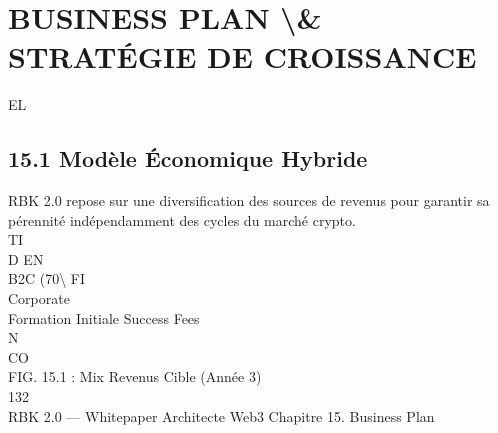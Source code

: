 \section{BUSINESS PLAN \textbackslash{}& STRATÉGIE DE CROISSANCE}
\vspace{0.5em}
\vspace{0.5em}
\vspace{0.5em}
\vspace{0.5em}
EL\\
\subsection{15.1 Modèle Économique Hybride}
RBK 2.0 repose sur une diversification des sources de revenus pour garantir sa pérennité indépendamment des cycles du marché crypto.\\
\vspace{0.5em}
\vspace{0.5em}
\vspace{0.5em}
\vspace{0.5em}
TI\\
D     EN\\
B2C (70\textbackslash{}%
\vspace{0.5em}
\vspace{0.5em}
\vspace{0.5em}
\vspace{0.5em}
FI\\
Corporate\\
Formation Initiale   Success Fees\\
\vspace{0.5em}
N\\
CO\\
FIG. 15.1 : Mix Revenus Cible (Année 3)\\
\vspace{0.5em}
\vspace{0.5em}
\vspace{0.5em}
\vspace{0.5em}
132\\
RBK 2.0 — Whitepaper Architecte Web3                                                                           Chapitre 15. Business Plan\\
\vspace{0.5em}
\vspace{0.5em}
